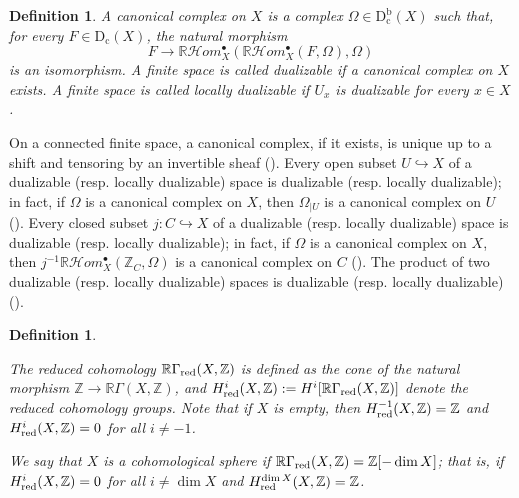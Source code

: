 \documentclass[amssymb,amscd,11pt,20pt]{amsart}
\newcommand{\ZZ}{{\mathbb Z}}
\newcommand{\RR}{\mathbb R}
\newcommand{\0}{\mathbf 0}
\newcommand{\pun}{{\scriptscriptstyle \bullet}}
\newcommand{\HHom}{\mathcal{H}om}
\theoremstyle{plain}
\newtheorem{defn}[thm]{Definition}
\numberwithin{equation}{thm}
\begin{document}
\begin{defn}\label{defcanonical}{\rm  A {\em canonical complex} on $X$ is a complex $\Omega\in \mathrm{D^b_c}(X)$ such that, for every $F\in \mathrm{D_c}(X)$, the natural morphism  
 \[F\to \RR\HHom_X^\pun(\RR\HHom_X^\pun(F,\Omega),\Omega)\] is an isomorphism. 
 A finite space is called {\em dualizable} if a canonical complex on $X$ exists. A finite space is called {\em locally dualizable} if $U_x$ is dualizable for every $x\in X$.
}\end{defn}



On a connected finite space, a canonical complex, if it exists,  is unique up to a shift and tensoring by an invertible sheaf (\cite[Thm. 4.8]{ST2}). Every open subset $U\hookrightarrow X$ of a dualizable (resp. locally dualizable) space is dualizable (resp. locally dualizable); in fact,  if $\Omega$ is a canonical complex on $X$, then $\Omega_{\vert U}$ is a canonical complex on $U$ (\cite[Thm. 4.5, (1)]{ST2}). Every closed subset $ j\colon C\hookrightarrow X$ of a dualizable (resp. locally dualizable) space is dualizable (resp. locally dualizable); in fact,  if $\Omega$ is a canonical complex on $X$, then $j^{-1}\RR\HHom_X^\pun(\ZZ_C,\Omega)$ is a canonical complex on $C$ (\cite[Thm. 4.5, (2)]{ST2}). The product of two dualizable (resp. locally dualizable) spaces is dualizable (resp. locally dualizable) (\cite[Prop. 4.24]{ST2}). 

\begin{defn}\label{coh-sphere} {\rm The {\em reduced cohomology} $\RR\Gamma_\text{\rm red}(X,\ZZ) $ is defined as the cone of the natural morphism $\ZZ\to\RR\Gamma(X,\ZZ)$, and $H^i_{\text{\rm red}} (X,\ZZ):= H^i[\RR\Gamma_\text{\rm red}(X,\ZZ)]$ denote the reduced cohomology groups.  Note that  if $X$ is empty, then $H^{-1}_{\text{\rm red}}(X,\ZZ)=\ZZ$ and $H^i_{\text{\rm red}}(X,\ZZ)=0$ for all $i\neq -1$.

We say that $X$ is a {\em cohomological sphere} if $\RR\Gamma_\text{\rm red}(X,\ZZ)=\ZZ[-\dim X]$; that is, if $H^i_{\text{\rm red}} (X,\ZZ)=0$ for all $i\neq\dim X$ and $H^{\dim X}_{\text{\rm red}} (X,\ZZ)=\ZZ$.}
\end{defn}
\end{document}
